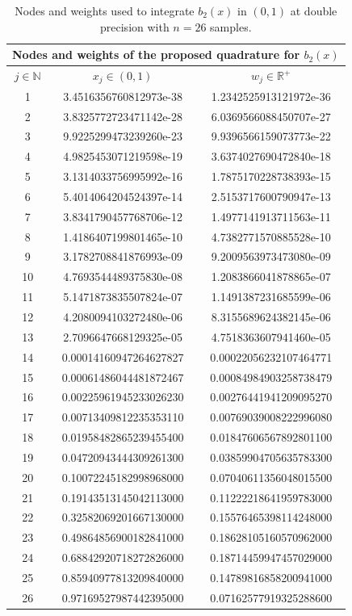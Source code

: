 \documentclass[a4paper, twosided]{book}
\begin{document}
\newpage
\begin{table}[H]
\centering
\begin{tabular}{|c||c|c|}
\hline
\multicolumn{3}{|c|}{\textbf{Nodes and weights of the proposed quadrature for $b_2(x)$ }} \\
\hline
$j\in\mathbb{N}$ & $x_j\in(0,1)$ & $w_j\in\mathbb{R}^+$ \\
\hline
1   &  3.4516356760812973e-38  &  1.2342525913121972e-36  \\
2   &  3.8325772723471142e-28  &  6.0369566088450707e-27  \\
3   &  9.9225299473239260e-23  &  9.9396566159073773e-22  \\
4   &  4.9825453071219598e-19  &  3.6374027690472840e-18  \\
5   &  3.1314033756995992e-16  &  1.7875170228738393e-15  \\
6   &  5.4014064204524397e-14  &  2.5153717600790947e-13  \\
7   &  3.8341790457768706e-12  &  1.4977141913711563e-11  \\
8   &  1.4186407199801465e-10  &  4.7382771570885528e-10  \\
9   &  3.1782708841876993e-09  &  9.2009563973473080e-09  \\
10  &  4.7693544489375830e-08  &  1.2083866041878865e-07  \\
11  &  5.1471873835507824e-07  &  1.1491387231685599e-06  \\
12  &  4.2080094103272480e-06  &  8.3155689624382145e-06  \\
13  &  2.7096647668129325e-05  &  4.7518363607941460e-05  \\
14  &  0.00014160947264627827  &  0.00022056232107464771  \\
15  &  0.00061486044481872467  &  0.00084984903258738479  \\
16  &  0.00225961945233026230  &  0.00276441941209095270  \\
17  &  0.00713409812235353110  &  0.00769039008222996080  \\
18  &  0.01958482865239455400  &  0.01847606567892801100  \\
19  &  0.04720943444309261300  &  0.03859904705635783300  \\
20  &  0.10072245182998968000  &  0.07040611356048015500  \\
21  &  0.19143513145042113000  &  0.11222218641959783000  \\
22  &  0.32582069201667130000  &  0.15576465398114248000  \\
23  &  0.49864856900182841000  &  0.18628105160570962000  \\
24  &  0.68842920718272826000  &  0.18714459947457029000  \\
25  &  0.85940977813209840000  &  0.14789816858200941000  \\
26  &  0.97169527987442395000  &  0.07162577919325288600  \\
\hline
\end{tabular}
  \caption{Nodes and weights used to integrate $b_2(x)$ in $(0,1)$ at double precision with $n=26$ samples.}
  \label{table2.6}
\end{table}
\end{document}
